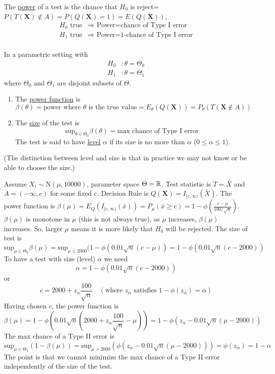 \documentclass[english, 11pt]{article}
\begin{document}
The \underline{power} of a test is the chance that $H_0$ is reject=$P(T(\bm{X})\not\in A)=P(Q(\bm{X})=1)=E(Q(\bm{X}))$,
$$
\begin{aligned}
H_0 \text{ true}&\Rightarrow \text{ Power=chance of Type I error}\\
H_1 \text{ true}&\Rightarrow \text{ Power=1-chance of Type I error}\\
\end{aligned}
$$
\begin{defn}
In a parametric setting with 
$$
\begin{aligned}
H_0&:\theta=\Theta_0\\
H_1&:\theta=\Theta_1
\end{aligned}
$$
where $\Theta_0$ and $\Theta_1$ are disjoint subsets of $\Theta$.
\begin{enumerate}
\item The \underline{power function} is
$$
\beta(\theta)=\text{power where $\theta$ is the true value}=E_{\theta}(Q(\bm{X}))=P_\theta(T(\bm{X}\not\in A))
$$
\item The \underline{size} of the test is 
$$
\text{sup}_{\theta\in\Theta_0}\beta(\theta)=\text{max chance of Type I error}
$$
The test is said to have \underline{level} $\alpha$ if its size is no more than $\alpha$ ($0\leqslant\alpha\leqslant 1$).
\end{enumerate}
(The distinction between level and size is that in practice we may not know or be able to choose the size.)
\end{defn}

\begin{exmp}
Assume $X_i\sim\text{N}(\mu, 10000)$, parameter space $\Theta={\mathbb{R}}$, Test statistic is $T=\bar{X}$ and $A=(-\infty, c)$ for some fixed $c$.
Decision Rule is $Q(\bm{X})=I_{[c, \infty)}(\bar{X})$. The power function is $\beta(\mu)=E_Q(I_{[c, \infty)}(\bar{x}))=P_\mu(\bar{x}\geqslant c)=1-\phi\left(\frac{c-\mu}{100/\sqrt{n}}\right)$. $\beta(\mu)$ is monotone in $\mu$ (this is not always true), as $\mu$ increases, $\beta(\mu)$ increases. So, larger $\mu$ means it is more likely that $H_0$ will be rejected. The size of test is 
$$
\text{sup}_{\mu\in\Theta_0}\beta(\mu)=\text{sup}_{\mu\leqslant2000}(1-\phi(0.01\sqrt{n}(c-\mu))=1-\phi(0.01\sqrt{n}(c-2000))
$$
To have a test with size (level) $\alpha$ we need
$$
\alpha=1-\phi(0.01\sqrt{n}(c-2000))
$$
or
$$
c=2000+z_\alpha\frac{100}{\sqrt{n}}\quad(\text{where $z_\alpha$ satisfies $1-\phi(z_\alpha)=\alpha$})
$$
Having chosen $c$, the power function is
$$
\beta(\mu)=1-\phi\left(0.01\sqrt{n}\left(2000+z_\alpha\frac{100}{\sqrt{n}}-\mu\right)\right)=1-\phi\left(z_\alpha-0.01\sqrt{n}(\mu-2000)\right)
$$
The max chance of a Type II error is
$$
\text{sup}_{\mu\in\Theta_1}(1-\beta(\mu))=\text{sup}_{\mu>2000}\left(\phi(z_\alpha-0.01\sqrt{n}(\mu-2000))\right)=\phi(z_\alpha)=1-\alpha
$$
The point is that we cannot minimize the max chance of a Type II error independently of the size of the test.
\end{exmp}
\end{document}
